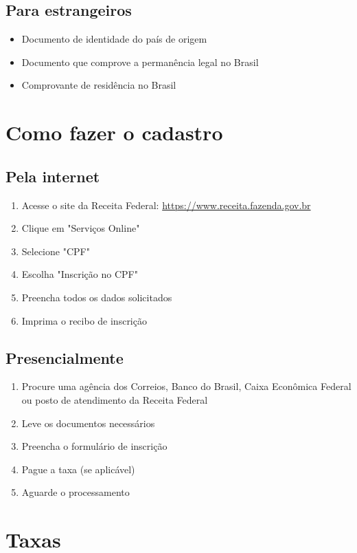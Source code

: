 \documentclass[12pt,a4paper]{article}
\begin{document}
\subsection{Para estrangeiros}
\begin{itemize}
    \item Documento de identidade do país de origem
    \item Documento que comprove a permanência legal no Brasil
    \item Comprovante de residência no Brasil
\end{itemize}

\section{Como fazer o cadastro}

\subsection{Pela internet}
\begin{enumerate}
    \item Acesse o site da Receita Federal: \url{https://www.receita.fazenda.gov.br}
    \item Clique em "Serviços Online"
    \item Selecione "CPF"
    \item Escolha "Inscrição no CPF"
    \item Preencha todos os dados solicitados
    \item Imprima o recibo de inscrição
\end{enumerate}

\subsection{Presencialmente}
\begin{enumerate}
    \item Procure uma agência dos Correios, Banco do Brasil, Caixa Econômica Federal ou posto de atendimento da Receita Federal
    \item Leve os documentos necessários
    \item Preencha o formulário de inscrição
    \item Pague a taxa (se aplicável)
    \item Aguarde o processamento
\end{enumerate}

\section{Taxas}
\end{document}
